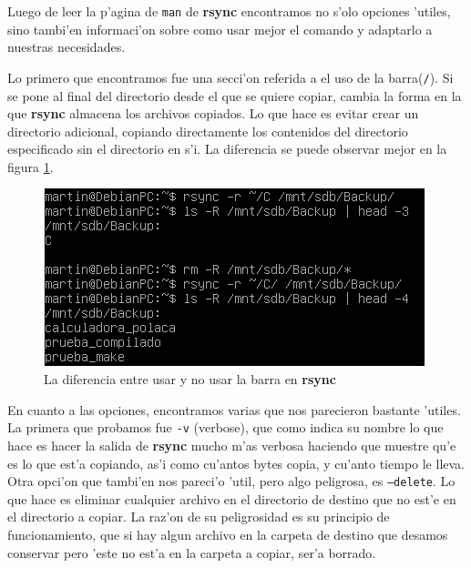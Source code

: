 \documentclass[11pt]{article}
\newcommand{\rsync}[0]{\textbf{rsync}}
\begin{document}
		Luego de leer la p'agina de \texttt{man} de \rsync{} encontramos no s'olo opciones 'utiles, sino tambi'en informaci'on sobre como usar mejor el comando y adaptarlo a nuestras necesidades.

		Lo primero que encontramos fue una secci'on referida a el uso de la barra(\texttt{/}). Si se pone al final del directorio desde el que se quiere copiar, cambia la forma en la que \rsync{} almacena los archivos copiados. Lo que hace es evitar crear un directorio adicional, copiando directamente los contenidos del directorio especificado sin el directorio en s'i. La diferencia se puede observar mejor en la figura \ref{fig:rsync_backup_forwardslash}.

		\begin{figure}[H]
    			\centering
    			\includegraphics[scale=0.80]{Images/rsync/rsync_backup_forwardslash.PNG}
    			\caption{La diferencia entre usar y no usar la barra en \rsync{}}
    			\label{fig:rsync_backup_forwardslash}
		\end{figure}

		En cuanto a las opciones, encontramos varias que nos parecieron bastante 'utiles. La primera que probamos fue \texttt{-v} (verbose), que como indica su nombre lo que hace es hacer la salida de \rsync{} mucho m'as verbosa haciendo que muestre qu'e es lo que est'a copiando, as'i como cu'antos bytes copia, y cu'anto tiempo le lleva. Otra opci'on que tambi'en nos pareci'o 'util, pero algo peligrosa, es \texttt{--delete}. Lo que hace es eliminar cualquier archivo en el directorio de destino que no est'e en el directorio a copiar. La raz'on de su peligrosidad es su principio de funcionamiento, que si hay algun archivo en la carpeta de destino que desamos conservar pero 'este no est'a en la carpeta a copiar, ser'a borrado.
\end{document}
